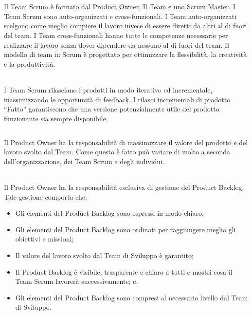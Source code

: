 
\section*{\color{Blue}{Scrum Team}}%
\label{sec:team}
Il Team Scrum \`e formato dal Product Owner, Il Team e uno Scrum Master. I Team  Scrum sono auto-organizzati e 
cross-funzionali. I Team auto-organizzati scelgono come meglio compiere il lavoro invece di essere diretti da altri al di fuori 
del team. I Team cross-funzionali hanno tutte le competenze necessarie per realizzare il lavoro senza dover dipendere da 
nessuno al di fuori del team. Il modello di team in Scrum \`e progettato per ottimizzare la flessibilità, la creativit\`a e la 
produttivit\`a. \newline

\\I Team Scrum rilasciano i prodotti in modo iterativo ed incrementale, massimizzando le opportunit\`a di feedback. I rilasci 
incrementali di prodotto ``Fatto'' garantiscono che una versione potenzialmente utile del prodotto funzionante sia sempre 
disponibile.

\subsection*{\color{SteelBlue}{Il Product Owner}}%
\label{sec:productowner}
Il Product Owner ha la responsabilit\`a  di massimizzare il valore del prodotto e del lavoro svolto dal Team. Come questo \`e 
fatto pu\`o variare di molto a seconda dell'organizzazione, dei Team Scrum e degli individui. \newline 

\\Il Product Owner ha la responsabilit\`a esclusiva di gestione del Product Backlog. Tale gestione comporta che:

\begin{itemize}
	\item Gli elementi del Product Backlog sono espressi in modo chiaro;
	\item Gli elementi del Product Backlog sono ordinati per raggiungere meglio gli obiettivi e missioni;
	\item Il valore del lavoro svolto dal Team di Sviluppo \`e garantito;
	\item Il Product Backlog \`e visibile, trasparente e chiaro a tutti e mostri cosa il Team Scrum lavorerà 
	successivamente; e,
	\item Gli elementi del Product Backlog sono compresi al necessario livello dal Team di Sviluppo.
\end{itemize}

